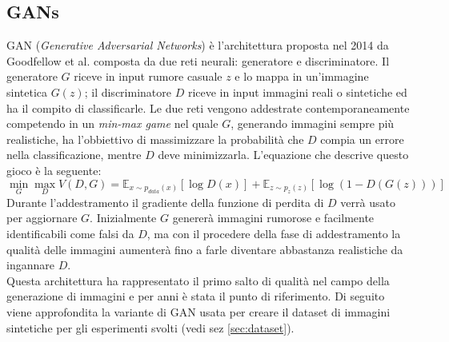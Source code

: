 \subsection{GANs}\label{subsec:GAN}
GAN (\textit{Generative Adversarial Networks}) è l'architettura proposta nel 2014 da Goodfellow et al. \cite{goodfellow2014generative} composta da due reti neurali: generatore e discriminatore. Il generatore $G$ riceve in input rumore casuale $z$ e lo mappa in un'immagine sintetica $G(z)$; il discriminatore $D$ riceve in input immagini reali o sintetiche ed ha il compito di classificarle.
Le due reti vengono addestrate contemporaneamente competendo in un \textit{min-max game} nel quale $G$, generando immagini sempre più realistiche, ha l'obbiettivo di massimizzare la probabilità che $D$ compia un errore nella classificazione, mentre $D$ deve minimizzarla. L'equazione che descrive questo gioco è la seguente:
\begin{equation}
\min_G \max_D V(D,G) = \mathbb{E}_{x \sim p_{data}(x)} [\log D(x)] + \mathbb{E}_{z \sim p_z(z)} [\log(1 - D(G(z)))]
\end{equation}\label{eq:gan}
Durante l'addestramento il gradiente della funzione di perdita di $D$ verrà usato per aggiornare $G$. Inizialmente $G$ genererà immagini rumorose e facilmente identificabili come falsi da $D$, ma con il procedere della fase di addestramento la qualità delle immagini aumenterà fino a farle diventare abbastanza realistiche da ingannare $D$.\\
Questa architettura ha rappresentato il primo salto di qualità nel campo della generazione di immagini e per anni è stata  il punto di riferimento.
Di seguito viene approfondita la variante di GAN usata per creare il dataset di immagini sintetiche per gli esperimenti svolti (vedi sez \ref{sec:dataset}).
